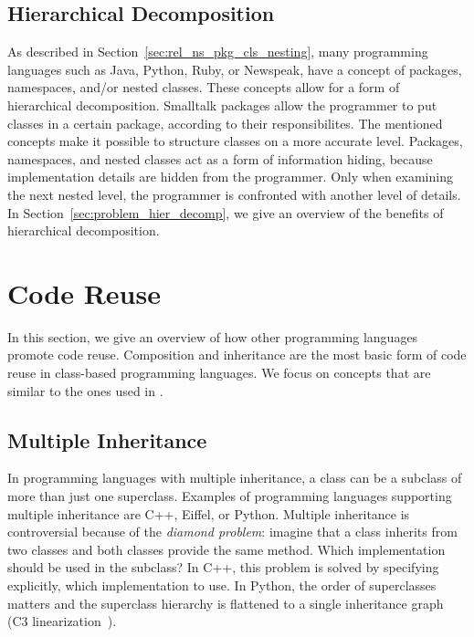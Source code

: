 \subsection{Hierarchical Decomposition}
As described in Section~\ref{sec:rel_ns_pkg_cls_nesting}, many programming languages such as Java, Python, Ruby, or Newspeak, have a concept of packages, namespaces, and/or nested classes. These concepts allow for a form of hierarchical decomposition. Smalltalk packages allow the programmer to put classes in a certain package, according to their responsibilites. The mentioned concepts make it possible to structure classes on a more accurate level. Packages, namespaces, and nested classes act as a form of information hiding, because implementation details are hidden from the programmer. Only when examining the next nested level, the programmer is confronted with  another level of details. In Section~\ref{sec:problem_hier_decomp}, we give an overview of the benefits of hierarchical decomposition.


\section{Code Reuse}
In this section, we give an overview of how other programming languages promote code reuse. Composition and inheritance are the most basic form of code reuse in class-based programming languages. We focus on concepts that are similar to the ones used in \msname.

\subsection{Multiple Inheritance}
\label{sec:rel_mult_inhh}
In programming languages with multiple inheritance, a class can be a subclass of more than just one superclass. Examples of programming languages supporting multiple inheritance are C++, Eiffel, or Python. Multiple inheritance is controversial because of the \emph{diamond problem}: imagine that a class inherits from two classes and both classes provide the same method. Which implementation should be used in the subclass? In C++, this problem is solved by specifying explicitly, which implementation to use. In Python, the order of superclasses matters and the superclass hierarchy is flattened to a single inheritance graph (C3 linearization~\cite{pythonmro23}).


